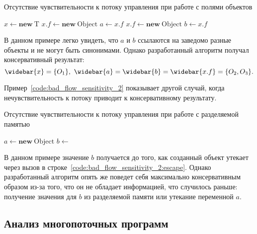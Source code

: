 \documentclass[14pt,titlepage,draft]{extarticle}
\newcommand{\type}[1]{\mathrm{#1}}
\newcommand{\op}[1]{\mathbf{#1}}
\newcommand{\pts}[1]{\widebar{#1}}
\begin{document}
      \begin{algorithm}
        \caption{Отсутствие чувствительности к потоку управления при работе с
          полями объектов}
        \label{code:bad_flow_sensitivity_1}
        \begin{algorithmic}[1]
          \State $x \gets \op{new}~\type{T}$
          \State $x.f \gets \op{new}~\type{Object}$
          \State $a \gets x.f$
          \State $x.f \gets \op{new}~\type{Object}$
          \State $b \gets x.f$
        \end{algorithmic}
      \end{algorithm}

      В данном примере легко увидеть, что $a$ и $b$ ссылаются на заведомо
      разные объекты и не могут быть синонимами. Однако разработанный алгоритм
      получал консервативный результат:
      \[ \pts{x} = \{O_1\},\ \pts{a} = \pts{b} = \pts{x.f} = \{O_2, O_3\}. \]

      Пример~\ref{code:bad_flow_sensitivity_2} показывает другой случай, когда
      нечувствительность к потоку приводит к консервативному результату.

      \begin{algorithm}
        \caption{Отсутствие чувствительности к потоку управления при работе с
          разделяемой памятью}
        \label{code:bad_flow_sensitivity_2}
        \begin{algorithmic}[1]
          \State $a \gets \op{new}~\type{Object}$
          \State $b \gets$ 
          \State {}
            \label{code:bad_flow_sensitivity_2:escape}
        \end{algorithmic}
      \end{algorithm}

      В данном примере значение $b$ получается до того, как созданный объект
      утекает через вызов в строке~\ref{code:bad_flow_sensitivity_2:escape}.
      Однако разработанный алгоритм опять же поведет себя максимально
      консервативным образом из-за того, что он не обладает информацией, что
      случилось раньше: получение значения для $b$ из разделяемой памяти или
      утекание переменной $a$.

    \subsection{Анализ многопоточных программ}
\end{document}

